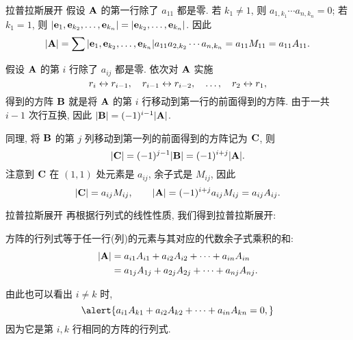 \begin{frame}{拉普拉斯展开}
	\onslide<+->
	假设 ${\mathbf{A}}$ 的第一行除了 $a_{11}$ 都是零.
	\onslide<+->
	若 $k_1\neq 1$, 则 $a_{1,k_1}\cdots a_{n,k_n}=0$; 若 $k_1=1$, 则 $|{\mathbf{e}}_1,{\mathbf{e}}_{k_2},\dots,{\mathbf{e}}_{k_n}|=|{\mathbf{e}}_{k_2},\dots,{\mathbf{e}}_{k_n}|$.
	\onslide<+->
	因此
	\[|{\mathbf{A}}|=\sum |{\mathbf{e}}_1,{\mathbf{e}}_{k_2},\dots,{\mathbf{e}}_{k_n}|a_{11}a_{2,k_2}\cdots a_{n,k_n}=a_{11} M_{11}=a_{11} A_{11}.\]

	\onslide<+->
	假设 ${\mathbf{A}}$ 的第 $i$ 行除了 $a_{ij}$ 都是零.
	\onslide<+->
	依次对 ${\mathbf{A}}$ 实施
	\[r_i\leftrightarrow r_{i-1},\quad r_{i-1}\leftrightarrow r_{i-2},\quad\dots,\quad r_2\leftrightarrow r_1,\]
	得到的方阵 ${\mathbf{B}}$ 就是将 ${\mathbf{A}}$ 的第 $i$ 行移动到第一行的前面得到的方阵.
	\onslide<+->
	由于一共 $i-1$ 次行互换, 因此 $|{\mathbf{B}}|=(-1)^{i-1}|{\mathbf{A}}|$.

	\onslide<+->
	同理, 将 ${\mathbf{B}}$ 的第 $j$ 列移动到第一列的前面得到的方阵记为 ${\mathbf{C}}$, 则
	\[|{\mathbf{C}}|=(-1)^{j-1}|{\mathbf{B}}|=(-1)^{i+j}|{\mathbf{A}}|.\]
	\onslide<+->
	注意到 ${\mathbf{C}}$ 在 $(1,1)$ 处元素是 $a_{ij}$, 余子式是 $M_{ij}$,
	\onslide<+->
	因此
	\[|{\mathbf{C}}|=a_{ij}M_{ij},\qquad |{\mathbf{A}}|=(-1)^{i+j}a_{ij}M_{ij}=a_{ij}A_{ij}.\]
\end{frame}


\begin{frame}{拉普拉斯展开}
	\onslide<+->
	再根据行列式的线性性质, 我们得到拉普拉斯展开:
	\begin{theorem}[行列式沿任一行(列)展开]
		方阵的行列式等于任一行(列)的元素与其对应的代数余子式乘积的和:
		\begin{align*}
			|{\mathbf{A}}|&=a_{i1}A_{i1}+a_{i2}A_{i2}+\cdots+a_{in}A_{in}\\
			&=a_{1j}A_{1j}+a_{2j}A_{2j}+\cdots+a_{nj}A_{nj}.
		\end{align*}
	\end{theorem}

	\onslide<+->
	由此也可以看出 \alert{$i\neq k$ 时,}
	\[\alert{a_{i1}A_{k1}+a_{i2}A_{k2}+\cdots+a_{in}A_{kn}=0,}\]
	\onslide<+->
	因为它是第 $i,k$ 行相同的方阵的行列式.
\end{frame}


